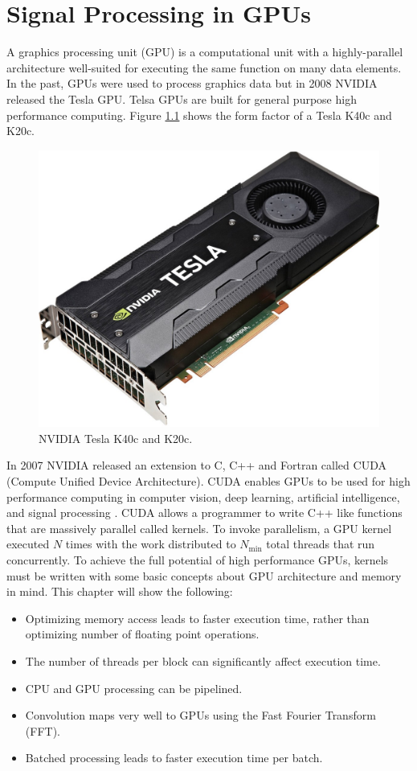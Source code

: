 \chapter{Signal Processing in GPUs}
\label{chap:gpu}
A graphics processing unit (GPU) is a computational unit with a highly-parallel architecture well-suited for executing the same function on many data elements.
In the past, GPUs were used to process graphics data but in 2008 NVIDIA released the Tesla GPU.
Telsa GPUs are built for general purpose high performance computing.
Figure \ref{fig:GPUpicture} shows the form factor of a Tesla K40c and K20c.
\begin{figure}
	\centering\includegraphics[width=5in]{figures/gpu_intro/k40c_k20c.jpg}
	\caption{NVIDIA Tesla K40c and K20c.}
	\label{fig:GPUpicture}
\end{figure}

In 2007 NVIDIA released an extension to C, C++ and Fortran called CUDA (Compute Unified Device Architecture).
CUDA enables GPUs to be used for high performance computing in computer vision, deep learning, artificial intelligence, and signal processing \cite{wikipedia-gpu:2015}.
CUDA allows a programmer to write C++ like functions that are massively parallel called kernels.
To invoke parallelism, a GPU kernel executed $N$ times with the work distributed to $N_\text{min}$ total threads that run concurrently.
To achieve the full potential of high performance GPUs, kernels must be written with some basic concepts about GPU architecture and memory in mind.
This chapter will show the following:
\begin{itemize}
\item Optimizing memory access leads to faster execution time, rather than optimizing number of floating point operations.
\item The number of threads per block can significantly affect execution time.
\item CPU and GPU processing can be pipelined.
\item Convolution maps very well to GPUs using the Fast Fourier Transform (FFT).
\item Batched processing leads to faster execution time per batch.
\end{itemize}


